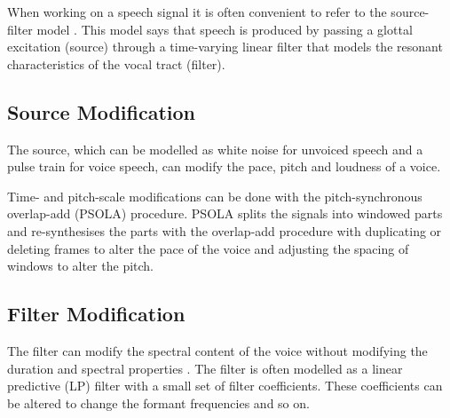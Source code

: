 When working on a speech signal it is often convenient to refer to the source-filter model \cite{taletek}. This model says that speech is produced by passing a glottal excitation (source) through a time-varying linear filter that models the resonant characteristics of the vocal tract (filter).

\subsection{Source Modification} %
\label{sub:source_modification}
The source, which can be modelled as white noise for unvoiced speech and a pulse train for voice speech, can modify the pace, pitch and loudness of a voice. 

Time- and pitch-scale modifications can be done with the pitch-synchronous overlap-add (PSOLA) procedure. PSOLA splits the signals into windowed parts and re-synthesises the parts with the overlap-add procedure with duplicating or deleting frames to alter the pace of the voice and adjusting the spacing of windows to alter the pitch.

\subsection{Filter Modification} %
\label{sub:filter_modification}
The filter can modify the spectral content of the voice without modifying the duration and spectral properties \cite{nguyen09}. The filter is often modelled as a linear predictive (LP) filter with a small set of filter coefficients. These coefficients can be altered to change the formant frequencies and so on.

